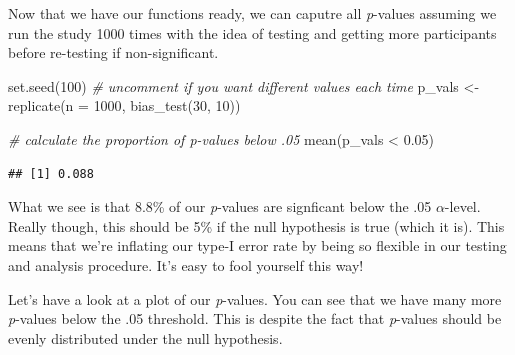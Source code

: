 \documentclass[
]{book}
\newenvironment{Shaded}{\begin{snugshade}}{\end{snugshade}}
\newcommand{\AttributeTok}[1]{\textcolor[rgb]{0.77,0.63,0.00}{#1}}
\newcommand{\CommentTok}[1]{\textcolor[rgb]{0.56,0.35,0.01}{\textit{#1}}}
\newcommand{\DecValTok}[1]{\textcolor[rgb]{0.00,0.00,0.81}{#1}}
\newcommand{\FloatTok}[1]{\textcolor[rgb]{0.00,0.00,0.81}{#1}}
\newcommand{\FunctionTok}[1]{\textcolor[rgb]{0.00,0.00,0.00}{#1}}
\newcommand{\NormalTok}[1]{#1}
\newcommand{\OtherTok}[1]{\textcolor[rgb]{0.56,0.35,0.01}{#1}}
\newcommand{\SpecialCharTok}[1]{\textcolor[rgb]{0.00,0.00,0.00}{#1}}
\begin{document}
Now that we have our functions ready, we can caputre all \emph{p}-values assuming we run the study 1000 times with the idea of testing and getting more participants before re-testing if non-significant.

\begin{Shaded}
\begin{Highlighting}[]
\FunctionTok{set.seed}\NormalTok{(}\DecValTok{100}\NormalTok{) }\CommentTok{\# uncomment if you want different values each time}
\NormalTok{p\_vals }\OtherTok{\textless{}{-}} \FunctionTok{replicate}\NormalTok{(}\AttributeTok{n =} \DecValTok{1000}\NormalTok{, }\FunctionTok{bias\_test}\NormalTok{(}\DecValTok{30}\NormalTok{, }\DecValTok{10}\NormalTok{))}

\CommentTok{\# calculate the proportion of p{-}values below .05}
\FunctionTok{mean}\NormalTok{(p\_vals }\SpecialCharTok{\textless{}} \FloatTok{0.05}\NormalTok{)}
\end{Highlighting}
\end{Shaded}

\begin{verbatim}
## [1] 0.088
\end{verbatim}

What we see is that 8.8\% of our \emph{p}-values are signficant below the .05 \(\alpha\)-level. Really though, this should be 5\% if the null hypothesis is true (which it is). This means that we're inflating our type-I error rate by being so flexible in our testing and analysis procedure. It's easy to fool yourself this way!

Let's have a look at a plot of our \emph{p}-values. You can see that we have many more \emph{p}-values below the .05 threshold. This is despite the fact that \emph{p}-values should be evenly distributed under the null hypothesis.
\end{document}
